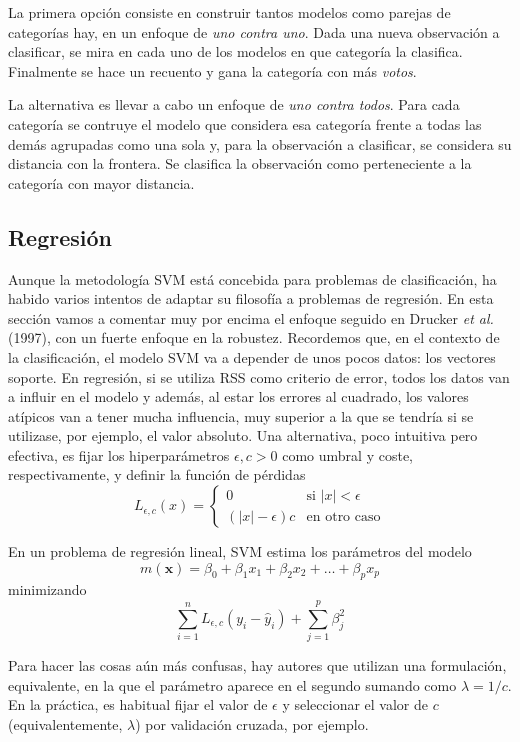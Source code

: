 \documentclass[
]{book}
\theoremstyle{break}
\theoremstyle{definition}
\theoremstyle{definition}
\theoremstyle{definition}
\theoremstyle{remark}
\begin{document}
La primera opción consiste en construir tantos modelos como parejas de categorías hay, en un enfoque de \emph{uno contra uno}. Dada una nueva observación a clasificar, se mira en cada uno de los modelos en que categoría la clasifica. Finalmente se hace un recuento y gana la categoría con más \emph{votos}.

La alternativa es llevar a cabo un enfoque de \emph{uno contra todos}. Para cada categoría se contruye el modelo que considera esa categoría frente a todas las demás agrupadas como una sola y, para la observación a clasificar, se considera su distancia con la frontera. Se clasifica la observación como perteneciente a la categoría con mayor distancia.

\hypertarget{regresiuxf3n}{%
\subsection{Regresión}\label{regresiuxf3n}}

Aunque la metodología SVM está concebida para problemas de clasificación, ha habido varios intentos de adaptar su filosofía a problemas de regresión. En esta sección vamos a comentar muy por encima el enfoque seguido en Drucker \emph{et al.} (1997), con un fuerte enfoque en la robustez. Recordemos que, en el contexto de la clasificación, el modelo SVM va a depender de unos pocos datos: los vectores soporte. En regresión, si se utiliza RSS como criterio de error, todos los datos van a influir en el modelo y además, al estar los errores al cuadrado, los valores atípicos van a tener mucha influencia, muy superior a la que se tendría si se utilizase, por ejemplo, el valor absoluto. Una alternativa, poco intuitiva pero efectiva, es fijar los hiperparámetros \(\epsilon,c > 0\) como umbral y coste, respectivamente, y definir la función de pérdidas
\[
L_{\epsilon,c} (x) = \left\{ \begin{array}{ll}
  0 & \mbox{si } |x|< \epsilon \\
  (|x| - \epsilon)c & \mbox{en otro caso}
  \end{array}
  \right.
\]

En un problema de regresión lineal, SVM estima los parámetros del modelo
\[m(\mathbf{x}) = \beta_0 + \beta_1 x_1 + \beta_2 x_2 + \ldots + \beta_p x_p\]
minimizando
\[\sum_{i=1}^n L_{\epsilon,c} (y_i - \hat y_i) + \sum_{j=1}^p \beta_j^2\]

Para hacer las cosas aún más confusas, hay autores que utilizan una formulación, equivalente, en la que el parámetro aparece en el segundo sumando como \(\lambda = 1/c\). En la práctica, es habitual fijar el valor de \(\epsilon\) y seleccionar el valor de \(c\) (equivalentemente, \(\lambda\)) por validación cruzada, por ejemplo.
\end{document}
